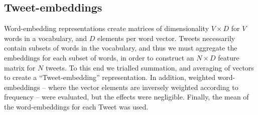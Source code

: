 \subsection{Tweet-embeddings}
Word-embedding representations create matrices of dimensionality $V \times D$ for $V$ words in a vocabulary, and $D$ elements per word vector. Tweets necessarily contain subsets of words in the vocabulary, and thus we must aggregate the embeddings for each subset of words, in order to construct an $N \times D$ feature matrix for $N$ tweets. To this end we trialled summation, and averaging of vectors to create a ``Tweet-embedding'' representation. In addition, weighted word-embeddings -- where the vector elements are inversely weighted according to frequency -- were evaluated, but the effects were negligible. \cite{schnabel2015evaluation} Finally, the mean of the word-embeddings for each Tweet was used.
